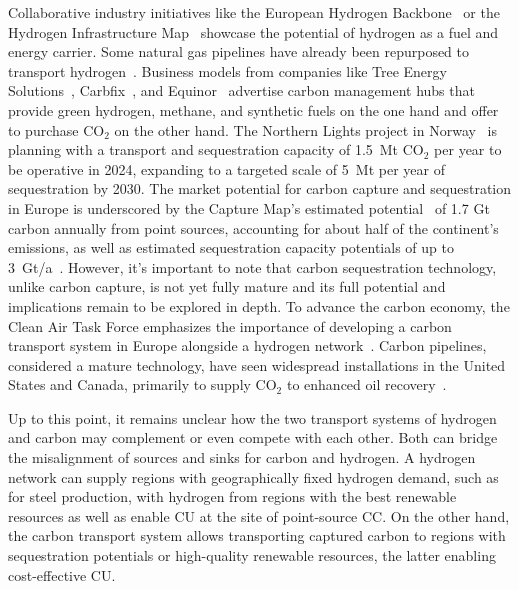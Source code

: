 \documentclass[twocolumn]{article}
\newcommand{\carbon}{CO$_2$}
\begin{document}
Collaborative industry initiatives like the European Hydrogen Backbone~\cite{gasforclimateEuropeanHydrogenBackbone2022} or the Hydrogen Infrastructure Map~\cite{H2InfrastructureMap} showcase the potential of hydrogen as a fuel and energy carrier. Some natural gas pipelines have already been repurposed to transport hydrogen~\cite{RohrFreiFuer}. Business models from companies like Tree Energy Solutions~\cite{TESHydrogenLife2023}, Carbfix~\cite{WeTurnCO2}, and Equinor~\cite{adomaitisEquinorRWEBuild2023} advertise carbon management hubs that provide green hydrogen, methane, and synthetic fuels on the one hand and offer to purchase \carbon{} on the other hand. The Northern Lights project in Norway~\cite{NorthernLightsWhat} is planning with a transport and sequestration capacity of 1.5~Mt \carbon{} per year to be operative in 2024, expanding to a targeted scale of 5~Mt per year of sequestration by 2030.
The market potential for carbon capture and sequestration in Europe is underscored by the Capture Map's estimated potential~\cite{ToolsGreenTransition} of 1.7 Gt carbon annually from point sources, accounting for about half of the continent's emissions, as well as estimated sequestration capacity potentials of up to 3~Gt/a~\cite{europeancommissionEuropeanCO2Storage}. However, it's important to note that carbon sequestration technology, unlike carbon capture, is not yet fully mature and its full potential and implications remain to be explored in depth.
To advance the carbon economy, the Clean Air Task Force emphasizes the importance of developing a carbon transport system in Europe alongside a hydrogen network~\cite{lockwoodEuropeanStrategyCarbon}. Carbon pipelines, considered a mature technology, have seen widespread installations in the United States and Canada, primarily to supply \carbon{} to enhanced oil recovery~\cite{righettiSitingCarbonDioxide2017,friedmannNETZEROGEOSPHERICRETURN}.

Up to this point, it remains unclear how the two transport systems of hydrogen and carbon may complement or even compete with each other. Both can bridge the misalignment of sources and sinks for carbon and hydrogen. A hydrogen network can supply regions with geographically fixed hydrogen demand, such as for steel production, with hydrogen from regions with the best renewable resources as well as enable CU at the site of point-source CC. On the other hand, the carbon transport system allows transporting captured carbon to regions with sequestration potentials or high-quality renewable resources, the latter enabling cost-effective CU.
\end{document}
